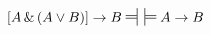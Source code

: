 \begin{earg}

\item $[A \eand (A \eor B)] \eif B\ndststile{}{} \hspace{.5em} \sdtstile{}{} A \eif B$\vspace{.5ex} %



\end{earg}


